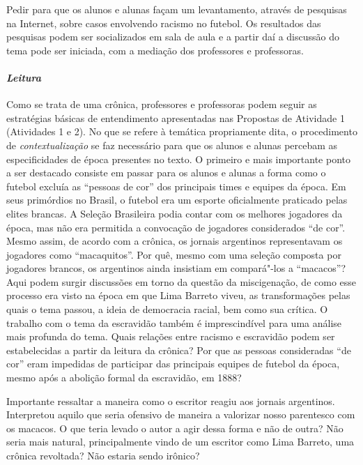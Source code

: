 \documentclass{extarticle}
\begin{document}
Pedir para que os alunos e alunas façam um levantamento, através de
pesquisas na Internet, sobre casos envolvendo racismo no futebol. Os
resultados das pesquisas podem ser socializados em sala de aula e a
partir daí a discussão do tema pode ser iniciada, com a mediação dos
professores e professoras.


\paragraph{\textit{Leitura}}
Como se trata de uma crônica, professores e professoras podem seguir
as estratégias básicas de entendimento apresentadas nas Propostas de
Atividade 1 (Atividades 1 e 2). No que se refere à temática propriamente
dita, o procedimento de \emph{contextualização} se faz necessário para
que os alunos e alunas percebam as especificidades de época presentes no
texto. O primeiro e mais importante ponto a ser destacado consiste em
passar para os alunos e alunas a forma como o futebol excluía as
``pessoas de cor'' dos principais times e equipes da época. Em seus
primórdios no Brasil, o futebol era um esporte oficialmente praticado
pelas elites brancas. A Seleção Brasileira podia contar com os melhores
jogadores da época, mas não era permitida a convocação de jogadores
considerados ``de cor''. Mesmo assim, de acordo com a crônica, os
jornais argentinos representavam os jogadores como ``macaquitos''. Por
quê, mesmo com uma seleção composta por jogadores brancos, os argentinos
ainda insistiam em compará"-los a ``macacos''? Aqui podem surgir
discussões em torno da questão da miscigenação, de como esse processo
era visto na época em que Lima Barreto viveu, as transformações pelas
quais o tema passou, a ideia de democracia racial, bem como sua crítica.
O trabalho com o tema da escravidão também é imprescindível para uma
análise mais profunda do tema. Quais relações entre racismo e escravidão
podem ser estabelecidas a partir da leitura da crônica? Por que as
pessoas consideradas ``de cor'' eram impedidas de participar das
principais equipes de futebol da época, mesmo após a abolição formal da
escravidão, em 1888?


Importante ressaltar a maneira como o escritor reagiu aos jornais
argentinos. Interpretou aquilo que seria ofensivo de maneira a valorizar
nosso parentesco com os macacos. O que teria levado o autor a agir dessa
forma e não de outra? Não seria mais natural, principalmente vindo de um
escritor como Lima Barreto, uma crônica revoltada? Não estaria sendo
irônico?
\end{document}
